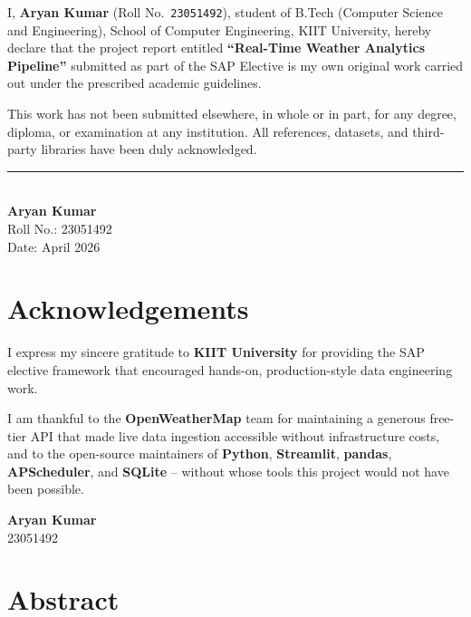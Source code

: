 \documentclass[12pt,a4paper]{report}
\begin{document}
I, \textbf{Aryan Kumar} (Roll No.\ \texttt{23051492}), student of B.Tech (Computer Science and Engineering), School of Computer Engineering, KIIT University, hereby declare that the project report entitled \textbf{``Real-Time Weather Analytics Pipeline''} submitted as part of the SAP Elective is my own original work carried out under the prescribed academic guidelines.

This work has not been submitted elsewhere, in whole or in part, for any degree, diploma, or examination at any institution. All references, datasets, and third-party libraries have been duly acknowledged.

\vspace{2cm}
\begin{flushright}
\rule{6cm}{0.5pt}\\
\textbf{Aryan Kumar}\\
Roll No.: 23051492\\
Date: April 2026
\end{flushright}

\chapter*{Acknowledgements}

I express my sincere gratitude to \textbf{KIIT University} for providing the SAP elective framework that encouraged hands-on, production-style data engineering work.

I am thankful to the \textbf{OpenWeatherMap} team for maintaining a generous free-tier API that made live data ingestion accessible without infrastructure costs, and to the open-source maintainers of \textbf{Python}, \textbf{Streamlit}, \textbf{pandas}, \textbf{APScheduler}, and \textbf{SQLite} -- without whose tools this project would not have been possible.

\vspace{1cm}
\begin{flushright}
\textbf{Aryan Kumar}\\
23051492
\end{flushright}

\chapter*{Abstract}
\end{document}
